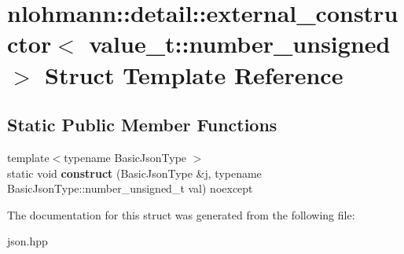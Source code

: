 \hypertarget{structnlohmann_1_1detail_1_1external__constructor_3_01value__t_1_1number__unsigned_01_4}{}\section{nlohmann\+:\+:detail\+:\+:external\+\_\+constructor$<$ value\+\_\+t\+:\+:number\+\_\+unsigned $>$ Struct Template Reference}
\label{structnlohmann_1_1detail_1_1external__constructor_3_01value__t_1_1number__unsigned_01_4}
\subsection*{Static Public Member Functions}
\begin{DoxyCompactItemize}
\item 
{\footnotesize template$<$typename Basic\+Json\+Type $>$ }\\static void {\bfseries construct} (Basic\+Json\+Type \&j, typename Basic\+Json\+Type\+::number\+\_\+unsigned\+\_\+t val) noexcept\hypertarget{structnlohmann_1_1detail_1_1external__constructor_3_01value__t_1_1number__unsigned_01_4_a17969b14852f43e04353858c87b0f539}{}\label{structnlohmann_1_1detail_1_1external__constructor_3_01value__t_1_1number__unsigned_01_4_a17969b14852f43e04353858c87b0f539}

\end{DoxyCompactItemize}


The documentation for this struct was generated from the following file\+:\begin{DoxyCompactItemize}
\item 
json.\+hpp\end{DoxyCompactItemize}
